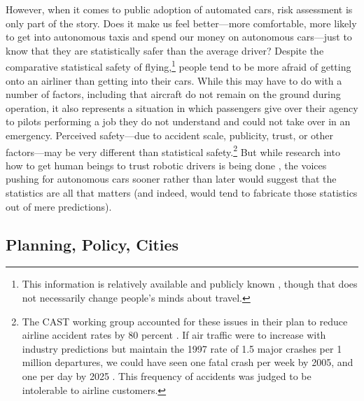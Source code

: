 However, when it comes to public adoption of automated cars,
risk assessment is only part of the story. Does it make us feel better---more
comfortable, more likely to get into autonomous taxis and spend our
money on autonomous cars---just to know that they are statistically safer
than the average driver? Despite the comparative
statistical safety of flying,\footnote{This information is relatively
  available and publicly known \cite{airlinereporter}, though that does not
  necessarily change people's minds about travel.}
people tend to be more afraid of getting onto an airliner than getting into their
cars. While this may have to do with a number of factors,
including that aircraft do not remain on the ground during operation,
it also represents a situation in which passengers give over their
agency to pilots performing a job they do not understand and could not
take over in an emergency. Perceived safety---due to accident scale,
publicity, trust, or other factors---may be very different than statistical
safety.\footnote{The CAST working group accounted for these
  issues in their plan to reduce airline accident rates by 80 percent \cite[p.
    28]{PARCCAST}.
If air traffic were to increase
with industry predictions but maintain the 1997 rate of 1.5 major
crashes per 1 million departures, we could have seen one fatal crash per
week by 2005, and one per day by 2025 \cite{predictmorecrashes}.
This frequency of accidents was judged to be intolerable to
airline customers.} But while research into how to get human beings to trust robotic drivers
is being done \cite{rossTrust}, the voices pushing for autonomous cars sooner
rather than later would suggest that the statistics are all that
matters (and indeed, would tend to fabricate those statistics out of
mere predictions). 


\subsection{Planning, Policy, Cities}




